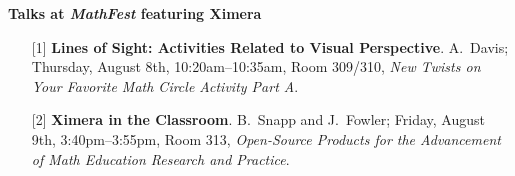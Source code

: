 \documentclass[twocolumn]{article}
\begin{document}
\begin{xframe}
    {\sffamily\bfseries Talks at \textsl{MathFest} featuring Ximera}
    \begin{itemize}
        \item[{[1]}] \textbf{Lines of Sight: Activities Related to Visual
            Perspective}. A.\ Davis; Thursday, August 8th,
        10:20am--10:35am,
        Room 309/310,
        \textit{New Twists on Your Favorite Math Circle Activity Part A}.
        \item[{[2]}] \textbf{Ximera in the Classroom}. B.\ Snapp and J.\
        Fowler;
        Friday, August 9th, 3:40pm--3:55pm, Room 313, \textit{Open-Source
            Products for
            the Advancement of Math Education Research and Practice}.
    \end{itemize}
\end{xframe}
\end{document}
